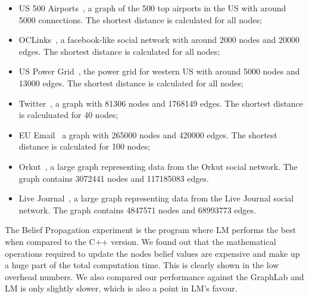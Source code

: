 \begin{itemize}
   \item US 500 Airports~\cite{usairports,tnet}, a graph of the 500 top airports in the US with around
      5000 connections. The shortest distance is calculated for all nodes;
      
   \item OCLinks~\cite{tnet,oclinks}, a facebook-like social network with around 2000 nodes and 20000 edges. The shortest
      distance is calculated for all nodes;

   \item US Power Grid~\cite{tnet,uspowergrid}, the power grid for western US with around 5000
      nodes and 13000 edges. The shortest distance is calculated for all nodes;

   \item Twitter~\cite{snapnets,NIPS2012_4532}, a graph with 81306 nodes and 1768149 edges.
      The shortest distance is calculuated for 40 nodes; 

   \item EU Email~\cite{snapnets,Leskovec:2007:GED:1217299.1217301} a graph with
      265000 nodes and 420000 edges. The shortest distance is calculated for 100
      nodes;


   \item Orkut~\cite{snapnets,Yang:2012:DEN:2350190.2350193}, a large graph
      representing data from the Orkut social network. The graph contains
      3072441 nodes and 117185083 edges.

   \item Live Journal~\cite{snapnets,Backstrom06groupformation}, a large graph representing data from the
      Live Journal social network. The graph contains 4847571 nodes and 68993773
      edges.

\end{itemize}

The Belief Propagation experiment is the program where LM performs the best when
compared to the C++ version. We found out that the mathematical operations
required to update the nodes belief values are expensive and make up a huge part
of the total computation time. This is clearly shown in the low overhead
numbers. We also compared our performance against the GraphLab and LM is only
slightly slower, which is also a point in LM's favour.

